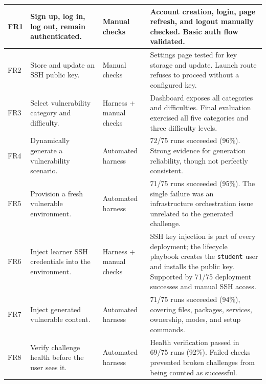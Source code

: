 \begin{longtable}{|p{}|p{}|p{}|p{}|}
	FR1         & Sign up, log in, log out, remain authenticated.                 & Manual checks           & Account creation, login, page refresh, and logout manually checked. Basic auth flow validated.                                                                                                         \\
	\hline
	FR2         & Store and update an SSH public key.                             & Manual checks           & Settings page tested for key storage and update. Launch route refuses to proceed without a configured key.                                                                                             \\
	\hline
	FR3         & Select vulnerability category and difficulty.                   & Harness + manual checks & Dashboard exposes all categories and difficulties. Final evaluation exercised all five categories and three difficulty levels.                                                                         \\
	\hline
	FR4         & Dynamically generate a vulnerability scenario.                  & Automated harness       & 72/75 runs succeeded (96\%). Strong evidence for generation reliability, though not perfectly consistent.                                                                                              \\
	\hline
	FR5         & Provision a fresh vulnerable environment.                       & Automated harness       & 71/75 runs succeeded (95\%). The single failure was an infrastructure orchestration issue unrelated to the generated challenge.                                                                        \\
	\hline
	FR6         & Inject learner SSH credentials into the environment.            & Harness + manual checks & SSH key injection is part of every deployment; the lifecycle playbook creates the \lstinline{student} user and installs the public key. Supported by 71/75 deployment successes and manual SSH access. \\
	\hline
	FR7         & Inject generated vulnerable content.                            & Automated harness       & 71/75 runs succeeded (94\%), covering files, packages, services, ownership, modes, and setup commands.                                                                                                 \\
	\hline
	FR8         & Verify challenge health before the user sees it.                & Automated harness       & Health verification passed in 69/75 runs (92\%). Failed checks prevented broken challenges from being counted as successful.                                                                           \\

\end{longtable}
